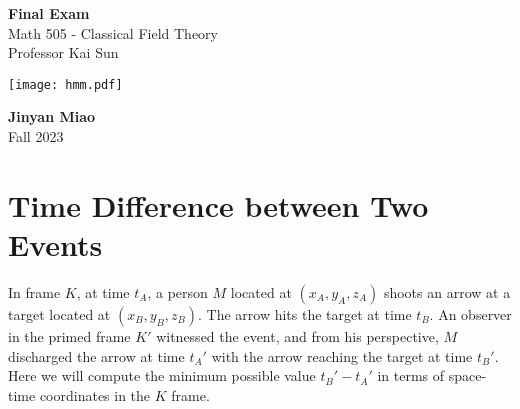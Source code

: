 \documentclass[11pt, onesided]{book}
\theoremstyle{break}
\theoremstyle{break}
\begin{document}
	\begin{titlepage}
		\begin{center}
			\vspace*{0.5cm}
			\Huge \color{red}
				\textbf{Final Exam}\\
			\vspace{0.5cm}			
			\Large \color{black}
			Math 505 - Classical Field Theory\\
			Professor Kai Sun
			\vspace{1.5cm}

			\texttt{[image: hmm.pdf]}
			
			
			\vspace{2cm}
			\LARGE
				\textbf{Jinyan Miao}\\
				\hfill\break
				\LARGE Fall 2023\\
			\vspace{1cm}

		\vspace*{\fill}
		\end{center}			
	\end{titlepage}
 

\newpage
\section{Time Difference between Two Events}
In frame $K$, at time $t_A$, a person $M$ located at $(x_A,y_A,z_A)$ shoots an arrow at a target located at $(x_B, y_B, z_B)$. The arrow hits the target at time $t_B$. An observer in the primed frame $K'$ witnessed the event, and from his perspective, $M$ discharged the arrow at time $t_A'$ with the arrow reaching the target at time $t_B'$.\\

Here we will compute the minimum possible value $t_B'-t_A'$ in terms of space-time coordinates in the $K$ frame. \\

\end{document}
